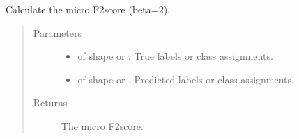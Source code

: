 \documentclass[letterpaper,10pt,english]{sphinxmanual}
\begin{document}
\begin{fulllineitems}
\label{\detokenize{pusion.evaluation.evaluation_metrics:pusion.evaluation.evaluation_metrics.micro_f2}}
\sphinxAtStartPar
Calculate the micro F2\sphinxhyphen{}score (beta=2).
\begin{quote}\begin{description}
\item[{Parameters}] \leavevmode\begin{itemize}
\item {} 
\sphinxAtStartPar
{} \textendash{}  of shape  or . True labels or class assignments.

\item {} 
\sphinxAtStartPar
{} \textendash{}  of shape  or . Predicted labels or
class assignments.

\end{itemize}

\item[{Returns}] \leavevmode
\sphinxAtStartPar
The micro F2\sphinxhyphen{}score.

\end{description}\end{quote}

\end{fulllineitems}

\end{document}
